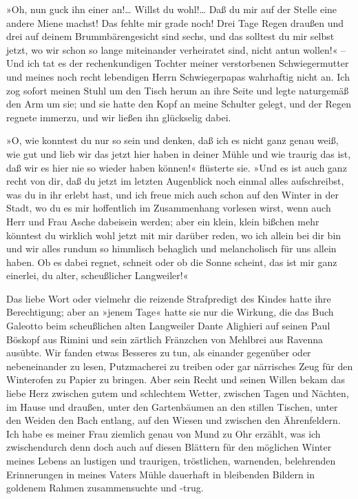 »Oh, nun guck ihn einer an!\ldots{} Willst du wohl!\ldots{} Daß du mir auf
der Stelle eine andere Miene machst! Das fehlte mir grade noch!
Drei Tage Regen draußen und drei auf deinem Brummbärengesicht sind
sechs, und das solltest du mir selbst jetzt, wo wir schon so lange
miteinander verheiratet sind, nicht antun wollen!« – Und ich tat es
der rechenkundigen Tochter meiner verstorbenen Schwiegermutter und
meines noch recht lebendigen Herrn Schwiegerpapas wahrhaftig nicht
an. Ich zog sofort meinen Stuhl um den Tisch herum an ihre Seite
und legte naturgemäß den Arm um sie; und sie hatte den Kopf an
meine Schulter gelegt, und der Regen regnete immerzu, und wir
ließen ihn glückselig dabei.

»O, wie konntest du nur so sein und denken, daß ich es nicht ganz
genau weiß, wie gut und lieb wir das jetzt hier haben in deiner
Mühle und wie traurig das ist, daß wir es hier nie so wieder haben
können!« flüsterte sie. »Und es ist auch ganz recht von dir, daß du
jetzt im letzten Augenblick noch einmal alles aufschreibst, was du
in ihr erlebt hast, und ich freue mich auch schon auf den Winter in
der Stadt, wo du es mir hoffentlich im Zusammenhang vorlesen wirst,
wenn auch Herr und Frau Asche dabeisein werden; aber ein klein,
klein bißchen mehr könntest du wirklich wohl jetzt mit mir darüber
reden, wo ich allein bei dir bin und wir alles rundum so himmlisch
behaglich und melancholisch für uns allein haben. Ob es dabei
regnet, schneit oder ob die Sonne scheint, das ist mir ganz
einerlei, du alter, scheußlicher Langweiler!«

Das liebe Wort oder vielmehr die reizende Strafpredigt des Kindes
hatte ihre Berechtigung; aber an »jenem Tage« hatte sie nur die
Wirkung, die das Buch Galeotto beim scheußlichen alten Langweiler
Dante Alighieri auf seinen Paul Böskopf aus Rimini und sein
zärtlich Fränzchen von Mehlbrei aus Ravenna ausübte. Wir fanden
etwas Besseres zu tun, als einander gegenüber oder nebeneinander zu
lesen, Putzmacherei zu treiben oder gar närrisches Zeug für den
Winterofen zu Papier zu bringen. Aber sein Recht und seinen Willen
bekam das liebe Herz zwischen gutem und schlechtem Wetter, zwischen
Tagen und Nächten, im Hause und draußen, unter den Gartenbäumen an
den stillen Tischen, unter den Weiden den Bach entlang, auf den
Wiesen und zwischen den Ährenfeldern. Ich habe es meiner Frau
ziemlich genau von Mund zu Ohr erzählt, was ich zwischendurch denn
doch auch auf diesen Blättern für den möglichen Winter meines
Lebens an lustigen und traurigen, tröstlichen, warnenden,
belehrenden Erinnerungen in meines Vaters Mühle dauerhaft in
bleibenden Bildern in goldenem Rahmen zusammensuchte und -trug.

